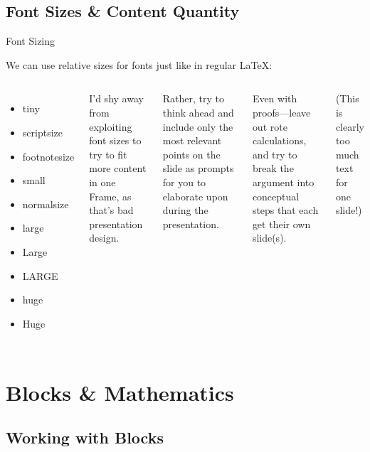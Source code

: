 \documentclass{beamer}
\begin{document}
\subsection{Font Sizes \& Content Quantity}

\begin{frame}{Font Sizing}

	We can use relative sizes for fonts just like in regular \LaTeX:
	
	\begin{columns}[c]
	\begin{itemize}
		\item {\tiny tiny}							
		\item {\scriptsize scriptsize}
		\item {\footnotesize footnotesize}
		\item {\small small}
		\item {\normalsize normalsize}
		\item {\large large}
		\item {\Large Large}
		\item {\LARGE LARGE}
		\item {\huge huge}
		\item {\Huge Huge}
	\end{itemize}
	
	I'd shy away from exploiting font sizes to try to fit more content in one Frame, as that's bad presentation design. 
	
	\medskip
	
	Rather, try to think ahead and include only the most relevant points on the slide as \alert{prompts} for you to elaborate upon during the presentation.
	
	\medskip
	
	Even with proofs---leave out rote calculations, and try to break the argument into conceptual steps that each get their own slide(s).
	
	{\tiny (This is clearly too much text for one slide!)}
	\end{columns}

\end{frame}


\section{Blocks \& Mathematics}
\subsection{Working with Blocks}
\end{document}
